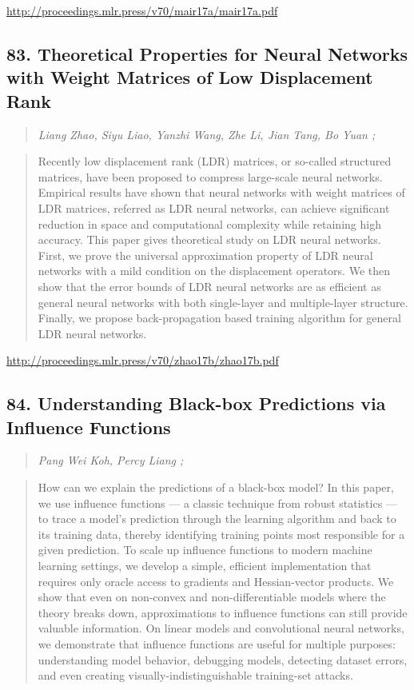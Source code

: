 \documentclass{article}
\begin{document}
\href{http://proceedings.mlr.press/v70/mair17a/mair17a.pdf}{http://proceedings.mlr.press/v70/mair17a/mair17a.pdf}

\subsection{83. Theoretical Properties for Neural Networks with Weight Matrices of Low Displacement Rank}

\begin{quote}
\footnotesize{\textit{Liang Zhao, Siyu Liao, Yanzhi Wang, Zhe Li, Jian Tang, Bo Yuan ;}}
\end{quote}

\begin{quote}
    Recently low displacement rank (LDR) matrices, or so-called structured matrices, have been proposed to compress large-scale neural networks. Empirical results have shown that neural networks with weight matrices of LDR matrices, referred as LDR neural networks, can achieve significant reduction in space and computational complexity while retaining high accuracy. This paper gives theoretical study on LDR neural networks. First, we prove the universal approximation property of LDR neural networks with a mild condition on the displacement operators. We then show that the error bounds of LDR neural networks are as efficient as general neural networks with both single-layer and multiple-layer structure. Finally, we propose back-propagation based training algorithm for general LDR neural networks.  \end{quote}

\href{http://proceedings.mlr.press/v70/zhao17b/zhao17b.pdf}{http://proceedings.mlr.press/v70/zhao17b/zhao17b.pdf}

\subsection{84. Understanding Black-box Predictions via Influence Functions}

\begin{quote}
\footnotesize{\textit{Pang Wei Koh, Percy Liang ;}}
\end{quote}

\begin{quote}
    How can we explain the predictions of a black-box model? In this paper, we use influence functions — a classic technique from robust statistics — to trace a model’s prediction through the learning algorithm and back to its training data, thereby identifying training points most responsible for a given prediction. To scale up influence functions to modern machine learning settings, we develop a simple, efficient implementation that requires only oracle access to gradients and Hessian-vector products. We show that even on non-convex and non-differentiable models where the theory breaks down, approximations to influence functions can still provide valuable information. On linear models and convolutional neural networks, we demonstrate that influence functions are useful for multiple purposes: understanding model behavior, debugging models, detecting dataset errors, and even creating visually-indistinguishable training-set attacks.  \end{quote}
\end{document}
